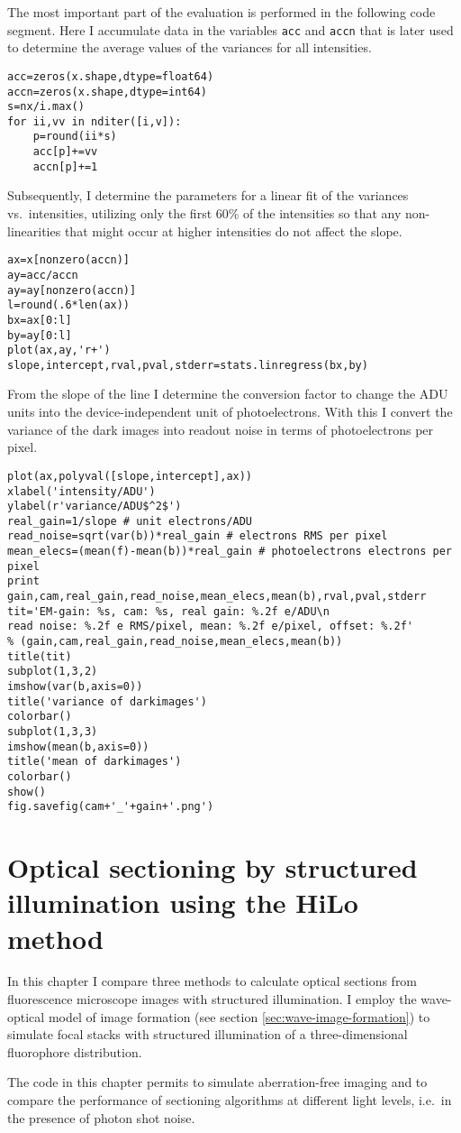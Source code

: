 The most important part of the evaluation is performed in the
following code segment. Here I accumulate data in the variables
\verb!acc! and \verb!accn! that is later used to determine the average
values of the variances for all intensities.
\begin{lstlisting}[style=mypython]
acc=zeros(x.shape,dtype=float64)
accn=zeros(x.shape,dtype=int64)
s=nx/i.max()
for ii,vv in nditer([i,v]):
    p=round(ii*s)
    acc[p]+=vv
    accn[p]+=1   
\end{lstlisting}
Subsequently, I determine the parameters for a linear fit of the
variances vs.\ intensities, utilizing only the first 60\% of the
intensities so that any non-linearities that might occur at higher
intensities do not affect the slope.
\begin{lstlisting}[style=mypython]
ax=x[nonzero(accn)]
ay=acc/accn
ay=ay[nonzero(accn)]
l=round(.6*len(ax))
bx=ax[0:l]
by=ay[0:l]
plot(ax,ay,'r+')
slope,intercept,rval,pval,stderr=stats.linregress(bx,by)
\end{lstlisting}
From the slope of the line I determine the conversion factor to change
the ADU units into the device-independent unit of photoelectrons. With
this I convert the variance of the dark images into readout noise in
terms of photoelectrons per pixel.
\begin{lstlisting}[style=mypython]
plot(ax,polyval([slope,intercept],ax))
xlabel('intensity/ADU')
ylabel(r'variance/ADU$^2$')
real_gain=1/slope # unit electrons/ADU
read_noise=sqrt(var(b))*real_gain # electrons RMS per pixel
mean_elecs=(mean(f)-mean(b))*real_gain # photoelectrons electrons per pixel
print gain,cam,real_gain,read_noise,mean_elecs,mean(b),rval,pval,stderr
tit='EM-gain: %s, cam: %s, real gain: %.2f e/ADU\n
read noise: %.2f e RMS/pixel, mean: %.2f e/pixel, offset: %.2f'
% (gain,cam,real_gain,read_noise,mean_elecs,mean(b))
title(tit)
subplot(1,3,2)
imshow(var(b,axis=0))
title('variance of darkimages')
colorbar()
subplot(1,3,3)
imshow(mean(b,axis=0))
title('mean of darkimages')
colorbar()
show()
fig.savefig(cam+'_'+gain+'.png')
\end{lstlisting}


\chapter{Optical sectioning by structured illumination using the HiLo method}
\label{sec:sectioning}
\begin{summary}
  In this chapter I compare three methods to calculate optical
  sections from fluorescence microscope images with structured
  illumination. I employ the wave-optical model of image formation
  (see section \ref{sec:wave-image-formation}) to simulate focal
  stacks with structured illumination of a three-dimensional
  fluorophore distribution. 

  The code in this chapter permits to simulate aberration-free imaging
  and to compare the performance of sectioning algorithms at different
  light levels, i.e.\ in the presence of photon shot noise.
\end{summary}

